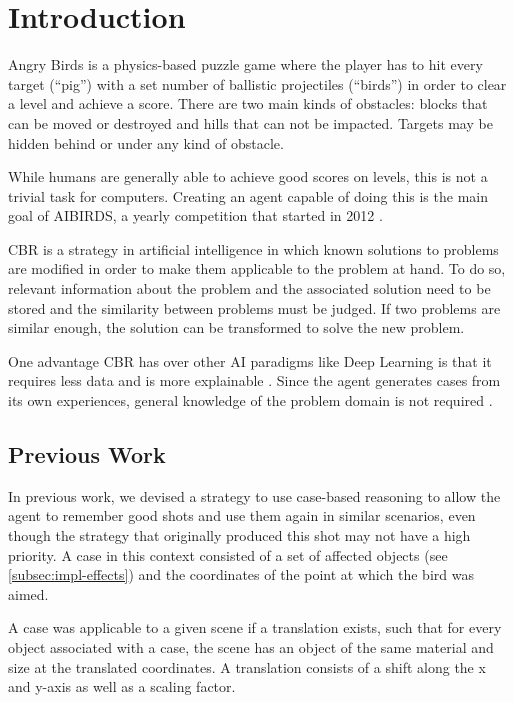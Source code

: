 \section{Introduction}\label{sec:intro}

Angry Birds is a physics-based puzzle game where the player has to hit every target (``pig'') with a set number of ballistic projectiles (``birds'') in order to clear a level and achieve a score.
There are two main kinds of obstacles: blocks that can be moved or destroyed and hills that can not be impacted. Targets may be hidden behind or under any kind of obstacle.

While humans are generally able to achieve good scores on levels, this is not a trivial task for computers.
Creating an agent capable of doing this is the main goal of AIBIRDS, a yearly competition that started in 2012 \cite{Renz2015AIBIRDSTA}.

\ac{CBR} is a strategy in artificial intelligence in which known solutions to problems are modified in order to make them applicable to the problem at hand.
To do so, relevant information about the problem and the associated solution need to be stored and the similarity between problems must be judged.
If two problems are similar enough, the solution can be transformed to solve the new problem.

One advantage \ac{CBR} has over other AI paradigms like Deep Learning is that it requires less data and is more explainable \cite{explainable-https://doi.org/10.48550/arxiv.1710.04806}. Since the agent generates cases from its own experiences, general knowledge of the problem domain is not required \cite{CBR-issues-variations-approaches}.


\subsection{Previous Work}\label{subsec:previous}
In previous work, we devised a strategy to use case-based reasoning to allow the agent to remember good shots and use them again in similar scenarios, even though the strategy that originally produced this shot may not have a high priority.
A case in this context consisted of a set of affected objects (see \ref{subsec:impl-effects}) and the coordinates of the point at which the bird was aimed.

A case was applicable to a given scene if a translation exists, such that for every object associated with a case, the scene has an object of the same material and size at the translated coordinates. A translation consists of a shift along the x and y-axis as well as a scaling factor.

